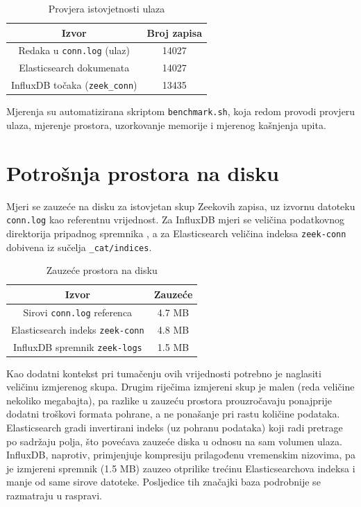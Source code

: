 \begin{table}[ht]
    \centering
    \begin{tabular}{|c|c|}
        \hline
        \textbf{Izvor} & \textbf{Broj zapisa} \\
        \hline
        Redaka u \texttt{conn.log} (ulaz) & 14027 \\
        Elasticsearch dokumenata & 14027 \\
        InfluxDB točaka (\texttt{zeek\_conn}) & 13435 \\
        \hline
    \end{tabular}
    \caption{Provjera istovjetnosti ulaza}
    \label{tab:verify}
\end{table}

Mjerenja su automatizirana skriptom \texttt{benchmark.sh}, koja redom provodi provjeru ulaza, mjerenje prostora, uzorkovanje memorije i mjerenog kašnjenja upita.

\section{Potrošnja prostora na disku}

Mjeri se zauzeće na disku za istovjetan skup Zeekovih zapisa, uz izvornu datoteku \texttt{conn.log} kao referentnu vrijednost. Za InfluxDB mjeri se
veličina podatkovnog direktorija pripadnog spremnika , a za Elasticsearch veličina indeksa \texttt{zeek-conn} dobivena iz sučelja
\texttt{\_cat/indices}.

\begin{table}[h]
  \centering
  \begin{tabular}{|c|c|}
      \hline
      Izvor & Zauzeće \\
      \hline
      Sirovi \texttt{conn.log} referenca & 4.7 MB \\
      Elasticsearch indeks \texttt{zeek-conn} & 4.8 MB \\
      InfluxDB spremnik \texttt{zeek-logs} & 1.5 MB \\
      \hline
  \end{tabular}
  \caption{Zauzeće prostora na disku}
  \label{tab:storage}
\end{table}

Kao dodatni kontekst pri tumačenju ovih vrijednosti potrebno je naglasiti veličinu izmjerenog skupa. Drugim riječima izmjereni skup je malen (reda veličine nekoliko megabajta), 
pa razlike u zauzeću prostora prouzročavaju ponajprije dodatni troškovi formata pohrane, a ne ponašanje pri rastu količine podataka. Elasticsearch gradi invertirani indeks (uz pohranu podataka) 
koji radi pretrage po sadržaju polja, što povećava zauzeće diska u odnosu na sam volumen ulaza. InfluxDB, naprotiv, primjenjuje kompresiju prilagođenu vremenskim nizovima, pa je
izmjereni spremnik (1.5 MB) zauzeo otprilike trećinu Elasticsearchova indeksa i manje od same sirove datoteke. Posljedice tih značajki baza podrobnije se razmatraju u raspravi.

